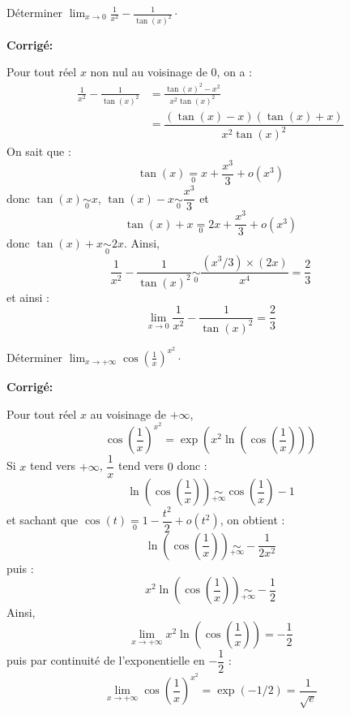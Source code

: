 \documentclass[a4paper,twoside,french,10pt]{VcCours}
\newcommand{\corr}{\textbf{Corrigé:}}
\begin{document}
\medskip



\begin{Exercice}{} Déterminer $\lim_{x \rightarrow 0} \frac{1}{x^2} - \frac{1}{\tan(x)^2} \cdot$
\end{Exercice} 

\corr

Pour tout réel $x$ non nul au voisinage de $0$, on a :
\begin{align*}
\frac{1}{x^2} - \frac{1}{\tan(x)^2} & = \frac{\tan(x)^2-x^2}{x^2 \tan(x)^2} \\
& = \dfrac{(\tan(x)-x)(\tan(x)+x)}{x^2 \tan(x)^2} 
\end{align*}
On sait que :
$$ \tan(x) \underset{0}{=} x + \dfrac{x^3}{3} + o(x^3)$$
donc $\tan(x) \underset{0}{\sim} x$, $\tan(x)-x \underset{0}{\sim} \dfrac{x^3}{3}$ et 
$$ \tan(x)+x \underset{0}{=} 2x + \dfrac{x^3}{3} + o(x^3)$$
donc $\tan(x)+x \underset{0}{\sim} 2x$. Ainsi,
$$ \frac{1}{x^2} - \frac{1}{\tan(x)^2} \underset{0}{\sim} \dfrac{(x^3/3) \times(2x)}{x^4} = \dfrac{2}{3}$$
et ainsi :
$$ \lim_{x \rightarrow 0} \frac{1}{x^2} - \frac{1}{\tan(x)^2} = \dfrac{2}{3}$$

\medskip



\begin{Exercice}{} Déterminer $\lim_{x \rightarrow + \infty}  \cos \left( \frac{1}{x} \right)^{x^2} \cdot$
\end{Exercice}

\corr

Pour tout réel $x$ au voisinage de $+ \infty$,
$$ \cos \left( \frac{1}{x} \right)^{x^2} = \exp \left(x^2 \ln \left( \cos \left( \dfrac{1}{x} \right) \right) \right)$$
Si $x$ tend vers $+ \infty$, $\dfrac{1}{x}$ tend vers $0$ donc :
$$ \ln \left( \cos \left( \dfrac{1}{x} \right) \right) \underset{+ \infty}{\sim} \cos \left( \dfrac{1}{x} \right) - 1 $$
et sachant que $\cos(t) \underset{0}{=} 1 - \dfrac{t^2}{2}+ o(t^2)$, on obtient :
$$  \ln \left( \cos \left( \dfrac{1}{x} \right) \right) \underset{+ \infty}{\sim} - \dfrac{1}{2x^2}$$
puis :
$$ x^2 \ln \left( \cos \left( \dfrac{1}{x} \right) \right) \underset{+ \infty}{\sim} - \dfrac{1}{2}$$
Ainsi,
$$ \lim_{x \rightarrow + \infty} x^2 \ln \left( \cos \left( \dfrac{1}{x} \right) \right) = -\dfrac{1}{2}$$
puis par continuité de l'exponentielle en $-\dfrac{1}{2}$ :
$$ \lim_{x \rightarrow + \infty}  \cos \left( \frac{1}{x} \right)^{x^2} = \exp(-1/2) = \dfrac{1}{\sqrt{e}}$$

\medskip
\end{document}
